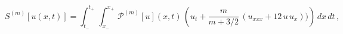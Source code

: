 \begin{equation*}
S^{(m)}[u(x,t)] = \int_{t_-}^{t_+} \, \int_{x_-}^{x_+}
\,{\mathcal{P}}^{(m)}[u](x,t)\,\left(u_t + \frac{m}{m + 3/2}\,
(u_{xxx}+12\,u\,u_x))\right)\,dx\,dt\,,
\end{equation*}

